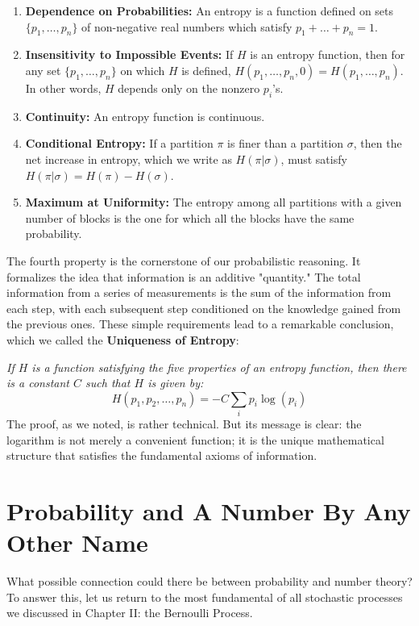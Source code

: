 \documentclass[12pt]{article}
\begin{document}
\begin{enumerate}
    \item \textbf{Dependence on Probabilities:} An entropy is a function defined on sets $\{p_1, \dots, p_n\}$ of non-negative real numbers which satisfy $p_1 + \dots + p_n = 1$.
    \item \textbf{Insensitivity to Impossible Events:} If $H$ is an entropy function, then for any set $\{p_1, \dots, p_n\}$ on which $H$ is defined, $H(p_1, \dots, p_n, 0) = H(p_1, \dots, p_n)$. In other words, $H$ depends only on the nonzero $p_i$'s.
    \item \textbf{Continuity:} An entropy function is continuous.
    \item \textbf{Conditional Entropy:} If a partition $\pi$ is finer than a partition $\sigma$, then the net increase in entropy, which we write as $H(\pi|\sigma)$, must satisfy $H(\pi|\sigma) = H(\pi) - H(\sigma)$.
    \item \textbf{Maximum at Uniformity:} The entropy among all partitions with a given number of blocks is the one for which all the blocks have the same probability.
\end{enumerate}
The fourth property is the cornerstone of our probabilistic reasoning. It formalizes the idea that information is an additive "quantity." The total information from a series of measurements is the sum of the information from each step, with each subsequent step conditioned on the knowledge gained from the previous ones. These simple requirements lead to a remarkable conclusion, which we called the \textbf{Uniqueness of Entropy}:

\textit{If $H$ is a function satisfying the five properties of an entropy function, then there is a constant $C$ such that $H$ is given by:}
\begin{equation}
H(p_1, p_2, \dots, p_n) = -C \sum_i p_i \log(p_i)
\end{equation}
The proof, as we noted, is rather technical. But its message is clear: the logarithm is not merely a convenient function; it is the unique mathematical structure that satisfies the fundamental axioms of information.

\section{Probability and A Number By Any Other Name}

What possible connection could there be between probability and number theory? To answer this, let us return to the most fundamental of all stochastic processes we discussed in Chapter II: the Bernoulli Process.
\end{document}
